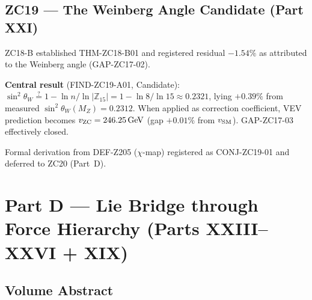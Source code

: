 \documentclass[11pt, a4paper]{article}
\newcommand{\Ztf}{\mathbb{Z}_{15}}
\begin{document}
\subsection{ZC19 --- The Weinberg Angle Candidate (Part XXI)}

\begin{zcbox}[title={ZC19: FIND-ZC19-A01 and CONJ-ZC19-01}]
\sloppy
ZC18-B established THM-ZC18-B01 and registered residual $-1.54\%$
as attributed to the Weinberg angle (GAP-ZC17-02).

\textbf{Central result} (FIND-ZC19-A01, Candidate):
$\sin^2\theta_W \stackrel{?}{=} 1 - \ln n/\ln|\Ztf|
= 1 - \ln 8/\ln 15 \approx 0.2321$,
lying $+0.39\%$ from measured $\sin^2\theta_W(M_Z) = 0.2312$.
When applied as correction coefficient, VEV prediction becomes
$v_{\rm ZC} = 246.25\,\mathrm{GeV}$ (gap $+0.01\%$ from $v_{\rm SM}$).
GAP-ZC17-03 effectively closed.

Formal derivation from DEF-Z205 ($\chi$-map) registered as
CONJ-ZC19-01 and deferred to ZC20 (Part~D).
\end{zcbox}

\newpage

\section{Part D --- Lie Bridge through Force Hierarchy (Parts XXIII--XXVI + XIX)}

\subsection*{Volume Abstract}
\end{document}
